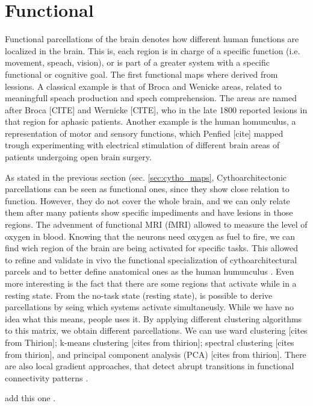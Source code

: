 \section{Functional}
Functional parcellations of the brain denotes how different human functions 
are localized in the brain. This is, each region is in charge of a specific
function (i.e. movement, speach, vision), or is part of a greater system with
a specific functional or cognitive goal. The first functional maps where derived
from lessions. A classical example is that of Broca and Wenicke areas, related
to meaningfull speach production and spech comprehension. The areas are named
after Broca [CITE] and Wernicke [CITE], who in the late 1800 reported lesions in
that region for aphasic patients. Another example is the human homunculus,
a representation of motor and sensory functions, which Penfied [cite] mapped
trough experimenting with electrical stimulation of different brain areas of
patients undergoing open brain surgery.

As stated in the previous section (sec. \ref{sec:cytho_maps}, Cythoarchitectonic
parcellations can be seen as functional ones, since they show close relation 
to function. However, they do not cover the whole brain, and we can only relate
them after many patients show specific impediments and have lesions in those
regions. The advenment of functional MRI (fMRI) allowed to measure the level of
oxygen in blood. Knowing that the neurons need oxygen as fuel to fire, we can
find wich region of the brain are being activated for specific tasks. This
allowed to refine and validate in vivo the functional specialization of 
cythoarchitectural parcels and to better define anatomical ones as the human
humunculus \cite{Lashkari2010, Michel2011}. Even more interesting is the fact
that there are some regions that activate while in a resting state. From the
no-task state (resting state), is possible to derive parcellations by seing
which systems activate simultaneusly. While we have no idea what this means,
people uses it. By applying different clustering algorithms to this matrix, we
obtain different parcellations. We can use ward clustering [cites from Thirion];
k-means clustering [cites from thirion]; spectral clustering [cites from thirion],
and principal component analysis (PCA) [cites from thirion]. There are also
local gradient approaches, that detect abrupt transitions in functional
connectivity patterns \cite{Wig2014, Schaefer2017}.

add this one \cite{Craddock2011}.

